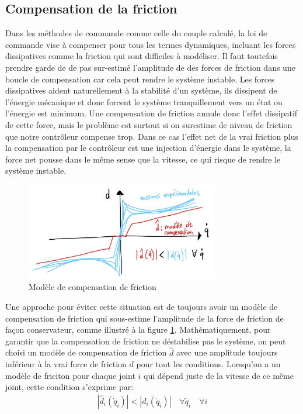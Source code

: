 \subsection{Compensation de la friction}

Dans les méthodes de commande comme celle du couple calculé, la loi de commande vise à compenser pour tous les termes dynamiques, incluant les forces dissipatives comme la friction qui sont difficiles à modéliser. Il faut toutefois prendre garde de de pas sur-estimé l'amplitude de des forces de friction dans une boucle de compensation car cela peut rendre le système instable. Les forces dissipatives aident naturellement à la stabilité d'un système, ils dissipent de l'énergie mécanique et donc forcent le système tranquillement vers un état ou l'énergie est minimum. Une compensation de friction annule donc l'effet dissipatif de cette force, mais le problème est surtout si on surestime de niveau de friction que notre contrôleur compense trop. Dans ce cas l'effet net de la vrai friction plus la compensation par le contrôleur est une injection d'énergie dans le système, la force net pousse dans le même sense que la vitesse, ce qui risque de rendre le système instable.

\begin{figure}[htp]
	\centering
		\includegraphics[width=0.75\textwidth]{fig/friction_compensation.jpg}
	\caption{Modèle de compensation de friction}
	\label{fig:friction_compensation}
\end{figure}

Une approche pour éviter cette situation est de toujours avoir un modèle de compensation de friction qui sous-estime l'amplitude de la force de friction de façon conservateur, comme illustré à la figure \ref{fig:friction_compensation}. Mathématiquement, pour garantir que la compensation de friction ne déstabilise pas le système, on peut choisi un modèle de compensation de friction $\hat{d}$ avec une amplitude toujours inférieur à la vrai force de friction $d$ pour tout les conditions. Lorsqu'on a un modèle de friciton pour chaque joint $i$ qui dépend juste de la vitesse de ce même joint, cette condition s'exprime par:
\begin{align}
\left| \hat{d}_i(\dot{q}_i) \right| < \left| d_i(\dot{q}_i) \right| \quad \forall \dot{q}_i \quad \forall i
\end{align}

